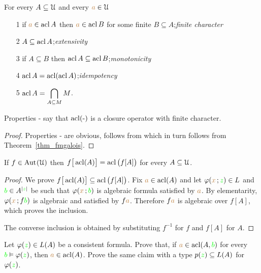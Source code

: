 \begin{corollary}\label{fmacl123} 
For every $A\subseteq\EuScript U$ and every ${\color{brown} a}\in\EuScript U$
\begin{itemize}
\item[1]  if ${\color{brown} a}\in\mathop{\rm acl} A$ then ${\color{brown} a}\in\mathop{\rm acl} B$ for some finite $B\subseteq A$;\hfill\emph{finite character}
\item[2]  $A\subseteq \mathop{\rm acl} A$;\hfill\emph{extensivity}
\item[3]  if $A\subseteq B$ then $\mathop{\rm acl} A\subseteq \mathop{\rm acl} B$;\hfill\emph{monotonicity}
\item[4]  $\mathop{\rm acl} A=\mathop{\rm acl}(\mathop{\rm acl} A)$;\hfill\emph{idempotency}
\item[5]  $\displaystyle\mathop{\rm acl} A=\bigcap_{A\subseteq M}M$.
\end{itemize} 
\end{corollary}

Properties - say that $\mathop{\rm acl}(\mbox{-})$ is a closure operator with finite character.

\begin{proof}
Properties - are obvious,  follows from  which in turn follows from Theorem~\ref{thm_fmgalois}.
\end{proof}

\begin{proposition}\label{prop_estensionemappechiusuraalgebrica}
If $f\in\textrm{Aut\kern.15ex}(\EuScript U)$ then $f\big[\mathop{\rm acl}(A)\big]=\mathop{\rm acl}\big(f[A]\big)$ for every $A\subseteq\EuScript U$.
\end{proposition}

\begin{proof}
We prove $f\big[\mathop{\rm acl}(A)\big]\subseteq\mathop{\rm acl}\big(f[A]\big)$.
Fix ${\color{brown} a}\in\mathop{\rm acl}(A)$ and let $\varphi({\color{brown} x}\,;{\color{green} z})\in L$ and ${\color{green} b}\in A^{|{\color{green} z}|}$ be such that 
$\varphi({\color{brown} x}\,;{\color{green} b})$ is algebraic formula satisfied by ${\color{brown} a}$.
By elementarity, $\varphi({\color{brown} x}\,;f{\color{green} b})$ is algebraic and satisfied by $f{\color{brown} a}$.
Therefore  $f{\color{brown} a}$ is algebraic over $f[A]$, which proves the inclusion.

The converse inclusion is obtained by substituting  $f^{-1}$ for $f$ and $f[A]$ for $A$.
\end{proof}

\begin{exercise}\label{pofu}
Let $\varphi({\color{green} z})\in L(A)$ be a consistent formula.
Prove that, if ${\color{brown} a}\in\mathop{\rm acl}(A,{\color{green} b})$ for every ${\color{green} b}\vDash\varphi({\color{green} z})$, then ${\color{brown} a}\in\mathop{\rm acl}(A)$.
Prove the same claim with a type $p({\color{green} z})\subseteq L(A)$ for $\varphi({\color{green} z})$.\QED
\end{exercise}


